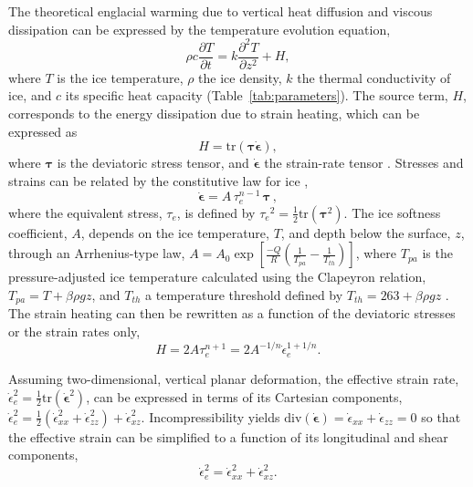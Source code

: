 \documentclass[utf8]{article}
\begin{document}
    The theoretical englacial warming due to vertical heat diffusion and
    viscous dissipation can be expressed by the temperature evolution equation,
    \begin{equation}
      \rho c \frac{\partial T}{\partial t}
        = k \frac{\partial^2 T}{\partial z^2} + H,
    \end{equation}
    where $T$ is the ice temperature, $\rho$ the ice density, $k$ the
    thermal conductivity of ice, and $c$ its specific heat capacity
    (Table~\ref{tab:parameters}). The source term, $H$, corresponds to the
    energy dissipation due to strain heating, which can be expressed as
    \begin{equation}
      H = \mathrm{tr}(\bm{\tau\dot\epsilon}),
    \end{equation}
    where $\bm\tau$ is the deviatoric stress tensor, and $\bm{\dot\epsilon}$ the
    strain-rate tensor \citep[p.~417]{Clarke.etal.1977, Cuffey.Paterson.2010}.
    Stresses and strains can be related by the constitutive law for ice
    \citep{Glen.1952, Nye.1953},
    \begin{equation}
        \bm{\dot\epsilon} = A\,\tau_e^{n-1}\,\bm{\tau} \,,
    \end{equation}
    where the equivalent stress, $\tau_e$, is defined by ${\tau_e}^2 =
    \frac{1}{2} \mathrm{tr}(\bm\tau^2)$. The ice softness coefficient, $A$,
    depends on the ice temperature, $T$, and depth below the surface, $z$,
    through an Arrhenius-type law,
    ${A = A_0 \exp[\frac{-Q}{R}(\frac{1}{T_{pa}}-\frac{1}{T_{th}})]}$, where
    $T_{pa}$ is the pressure-adjusted ice temperature calculated using the
    Clapeyron relation, ${T_{pa} = T + \beta \rho g z}$, and $T_{th}$ a
    temperature threshold defined by ${T_{th} = 263 + \beta \rho g z}$
    \citep[p.~72]{Cuffey.Paterson.2010}.
    The strain heating can then be rewritten as a function of the deviatoric
    stresses or the strain rates only,
    \begin{equation}
        H = 2 A \tau_e^{n+1} = 2 A^{-1/n} \dot\epsilon_e^{1+1/n}.
    \end{equation}

    Assuming two-dimensional, vertical planar deformation, the effective strain
    rate, ${\dot\epsilon_e^2 = \frac{1}{2}\mathrm{tr}(\bm{\dot\epsilon}^2)}$,
    can be expressed in terms of its Cartesian components, ${\dot\epsilon_e^2 =
    \frac{1}{2}(\dot\epsilon_{xx}^2 + \dot\epsilon_{zz}^2) +
    \dot\epsilon_{xz}^2}$. Incompressibility yields
    ${\mathrm{div}(\bm{\dot\epsilon}) = \dot\epsilon_{xx} + \dot\epsilon_{zz} =
    0}$ so that the effective strain can be simplified to a function of its
    longitudinal and shear components,
    \begin{equation}
        \dot\epsilon_e^2 = \dot\epsilon_{xx}^2 + \dot\epsilon_{xz}^2.
    \end{equation}
\end{document}
